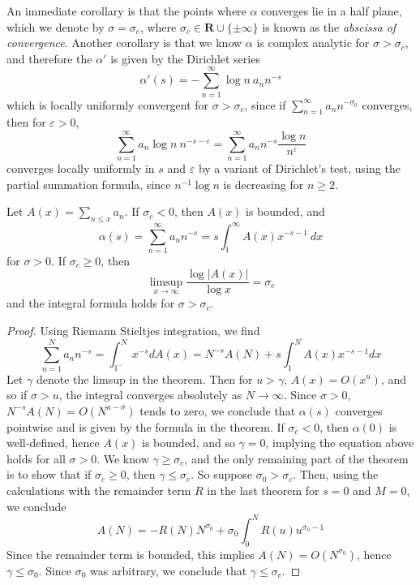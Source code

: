 An immediate corollary is that the points where $\alpha$ converges lie in a half plane, which we denote by $\sigma = \sigma_c$, where $\sigma_c \in \mathbf{R} \cup \{ \pm \infty \}$ is known as the {\it abscissa of convergence}. Another corollary is that we know $\alpha$ is complex analytic for $\sigma > \sigma_c$, and therefore the $\alpha'$ is given by the Dirichlet series
%
\[ \alpha'(s) = - \sum_{n = 1}^\infty \log n\ a_n n^{-s} \]
%
which is locally uniformly convergent for $\sigma > \sigma_c$, since if $\sum_{n = 1}^\infty a_n n^{-\sigma_0}$ converges, then for $\varepsilon > 0$,
%
\[ \sum_{n = 1}^\infty a_n \log n\ n^{-s-\varepsilon} = \sum_{n = 1}^\infty a_n n^{-s} \frac{\log n}{n^\varepsilon} \]
%
converges locally uniformly in $s$ and $\varepsilon$ by a variant of Dirichlet's test, using the partial summation formula, since $n^{-1} \log n$ is decreasing for $n \geq 2$.

\begin{theorem}
    Let $A(x) = \sum_{n \leq x} a_n$. If $\sigma_c < 0$, then $A(x)$ is bounded, and
    \[ \alpha(s) = \sum_{n = 1}^\infty a_n n^{-s} = s \int_1^\infty A(x) x^{-s-1}\ dx \]
    for $\sigma > 0$. If $\sigma_c \geq 0$, then
    \[ \limsup_{x \to \infty} \frac{\log |A(x)|}{\log x} = \sigma_c \]
    and the integral formula holds for $\sigma > \sigma_c$.
\end{theorem}
\begin{proof}
    Using Riemann Stieltjes integration, we find
    \[ \sum_{n = 1}^N a_n n^{-s} = \int_{1^-}^N x^{-s} dA(x) = N^{-s} A(N) + s \int_1^N A(x) x^{-s-1} dx \]
    Let $\gamma$ denote the limsup in the theorem. Then for $u > \gamma$, $A(x) = O(x^u)$, and so if $\sigma > u$, the integral converges absolutely as $N \to \infty$. Since $\sigma > 0$, $N^{-s} A(N) = O(N^{u-\sigma})$ tends to zero, we conclude that $\alpha(s)$ converges pointwise and is given by the formula in the theorem. If $\sigma_c < 0$, then $\alpha(0)$ is well-defined, hence $A(x)$ is bounded, and so $\gamma = 0$, implying the equation above holds for all $\sigma > 0$. We know $\gamma \geq \sigma_c$, and the only remaining part of the theorem is to show that if $\sigma_c \geq 0$, then $\gamma \leq \sigma_c$. So suppose $\sigma_0 > \sigma_c$. Then, using the calculations with the remainder term $R$ in the last theorem for $s = 0$ and $M = 0$, we conclude
    \[ A(N) = -R(N)N^{\sigma_0} + \sigma_0 \int_0^N R(u) u^{\sigma_0 - 1} \]
    Since the remainder term is bounded, this implies $A(N) = O(N^{\sigma_0})$, hence $\gamma \leq \sigma_0$. Since $\sigma_0$ was arbitrary, we conclude that $\gamma \leq \sigma_c$.
\end{proof}

